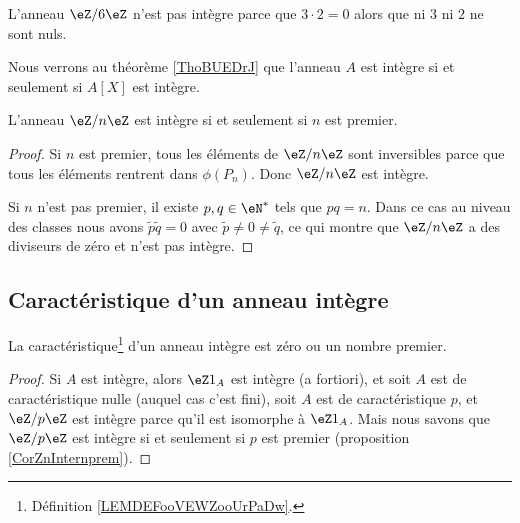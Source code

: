 \begin{example}
    L'anneau \( \eZ/6\eZ\) n'est pas intègre parce que \( 3\cdot 2=0\) alors que ni \( 3\) ni \( 2\) ne sont nuls.
\end{example}

Nous verrons au théorème \ref{ThoBUEDrJ} que l'anneau \( A\) est intègre si et seulement si \( A[X]\) est intègre.

\begin{corollary}   \label{CorZnInternprem}
    L'anneau \( \eZ/n\eZ\) est intègre si et seulement si \( n\) est premier.
\end{corollary}

\begin{proof}
    Si \( n\) est premier, tous les éléments de \( \eZ/n\eZ\) sont inversibles parce que tous les éléments rentrent dans \( \phi(P_n)\). Donc \( \eZ/n\eZ\) est intègre.

    Si \( n\) n'est pas premier, il existe \( p,q\in\eN^*\) tels que \( pq=n\). Dans ce cas au niveau des classes nous avons \( \tilde p\tilde q=0\) avec \( \tilde p\neq 0\neq\tilde q\), ce qui montre que \( \eZ/n\eZ\) a des diviseurs de zéro et n'est pas intègre.
\end{proof}

\subsection{Caractéristique d'un anneau intègre}

\begin{lemma}       \label{LemCaractIntergernbrcartpre}
    La caractéristique\footnote{Définition \ref{LEMDEFooVEWZooUrPaDw}.} d'un anneau intègre est zéro ou un nombre premier.
\end{lemma}

\begin{proof}
    Si \( A\) est intègre, alors \( \eZ 1_A\) est intègre (a fortiori), et soit $A$ est de caractéristique nulle (auquel cas c'est fini), soit $A$ est de caractéristique $p$, et \( \eZ/p\eZ\) est intègre parce qu'il est isomorphe à \( \eZ 1_A\). Mais nous savons que \( \eZ/p\eZ\) est intègre si et seulement si \( p\) est premier (proposition \ref{CorZnInternprem}).
\end{proof}

